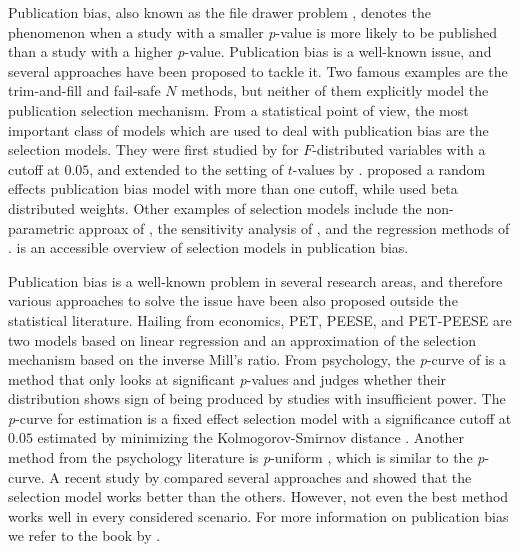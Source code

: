 \documentclass[useAMS,usenatbib,referee]{biom}
\begin{document}
Publication bias, also known as the file drawer problem \citep{Rosenthal1979-pm}, denotes the phenomenon when a study with a smaller \textit{p}-value is more likely to be published than a study with a higher \textit{p}-value. Publication bias is a well-known issue, and several approaches have been proposed to tackle it. Two famous examples are the trim-and-fill \citep{duval2000trim} and fail-safe $N$ \citep{becker2005failsafe} methods, but neither of them explicitly model the publication selection mechanism. From a statistical point of view, the most important class of models which are used to deal with publication bias are the selection models. They were first studied by \citet{hedges1984estimation} for $F$-distributed variables with a cutoff at $0.05$, and extended to the setting of $t$-values by \citet{iyengar1988selection}. \citet{hedges1992modeling} proposed a random effects publication bias model with more than one cutoff, while \citet{citkowicz2017parsimonious} used beta distributed weights. Other examples of selection models include the non-parametric approax of \cite{dear1992approach}, the sensitivity analysis of \cite{CopasShi2000}, and the regression methods of \cite{Vevea1995-on}. \citet{mcshane2016adjusting} is an accessible overview of selection models in publication bias.

Publication bias is a well-known problem in several research areas, and therefore various approaches to solve the issue have been also proposed outside the statistical literature. Hailing from economics, PET, PEESE, and PET-PEESE \citep{stanley2014meta} are two models based on linear regression and an approximation of the selection mechanism based on the inverse Mill's ratio. From psychology, the \textit{p}-curve of \citet{simonsohn2014p} is a method that only looks at significant \textit{p}-values and judges whether their distribution shows sign of being produced by studies with insufficient power. The \textit{p}-curve for estimation \citep{simonsohn2014} is a fixed effect selection model with a significance cutoff at $0.05$ estimated by minimizing the Kolmogorov-Smirnov distance \citep{mcshane2016adjusting}. Another method from the psychology literature is \textit{p}-uniform \citep{van2015meta}, which is similar to the \textit{p}-curve. A recent study by \citet{carter2019correcting} compared several approaches and showed that the selection model works better than the others. However, not even the best method works well in every considered scenario. For more information on publication bias we refer to the book by \citet{rothstein2006publication}.
\end{document}
